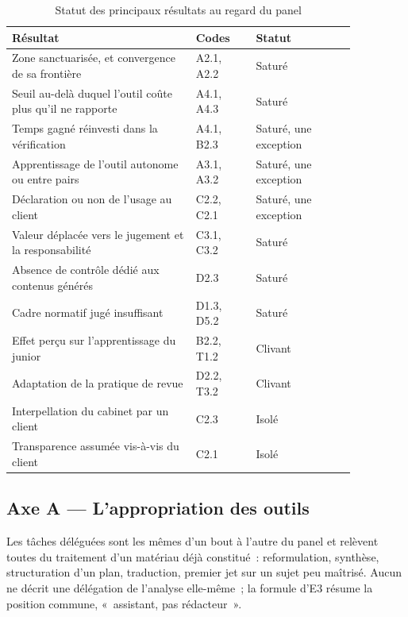 \begin{table}[h]
\centering
\small
\begin{tabular}{|p{0.46\linewidth}|p{0.15\linewidth}|p{0.25\linewidth}|}
\hline
\textbf{Résultat} & \textbf{Codes} & \textbf{Statut} \\
\hline
Zone sanctuarisée, et convergence de sa frontière & A2.1, A2.2 & Saturé \\
\hline
Seuil au-delà duquel l'outil coûte plus qu'il ne rapporte & A4.1, A4.3 & Saturé \\
\hline
Temps gagné réinvesti dans la vérification & A4.1, B2.3 & Saturé, une exception \\
\hline
Apprentissage de l'outil autonome ou entre pairs & A3.1, A3.2 & Saturé, une exception \\
\hline
Déclaration ou non de l'usage au client & C2.2, C2.1 & Saturé, une exception \\
\hline
Valeur déplacée vers le jugement et la responsabilité & C3.1, C3.2 & Saturé \\
\hline
Absence de contrôle dédié aux contenus générés & D2.3 & Saturé \\
\hline
Cadre normatif jugé insuffisant & D1.3, D5.2 & Saturé \\
\hline
Effet perçu sur l'apprentissage du junior & B2.2, T1.2 & Clivant \\
\hline
Adaptation de la pratique de revue & D2.2, T3.2 & Clivant \\
\hline
Interpellation du cabinet par un client & C2.3 & Isolé \\
\hline
Transparence assumée vis-à-vis du client & C2.1 & Isolé \\
\hline
\end{tabular}
\caption{Statut des principaux résultats au regard du panel}
\label{tab:statut-resultats}
\end{table}

\subsection{Axe A --- L'appropriation des outils}

Les tâches déléguées sont les mêmes d'un bout à l'autre du panel et relèvent toutes du
traitement d'un matériau déjà constitué~: reformulation, synthèse, structuration d'un plan,
traduction, premier jet sur un sujet peu maîtrisé. Aucun ne décrit une délégation de
l'analyse elle-même~; la formule d'E3 résume la position commune, «~assistant, pas
rédacteur~».

